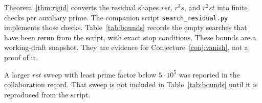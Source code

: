 \documentclass[11pt,reqno]{amsart}
\theoremstyle{definition}
\begin{document}
Theorem~\ref{thm:rigid} converts the residual shapes \(rst\), \(r^3s\), and \(r^2st\) into finite checks per auxiliary prime. The companion script \texttt{search\_residual.py} implements those checks. Table~\ref{tab:bounds} records the empty searches that have been rerun from the script, with exact stop conditions. These bounds are a working-draft snapshot. They are evidence for Conjecture~\ref{conj:vanish}, not a proof of it.

\begin{table}[ht]
\centering
\caption{Residual searches with exact stop conditions. ``Hits'' means a complete prime solution of~\eqref{eq:jumps} of the indicated shape. Reproduce with the companion script.}
\label{tab:bounds}
\end{table}

A larger \(rst\) sweep with least prime factor below \(5\cdot 10^5\) was reported in the collaboration record. That sweep is not included in Table~\ref{tab:bounds} until it is reproduced from the script.
\end{document}
